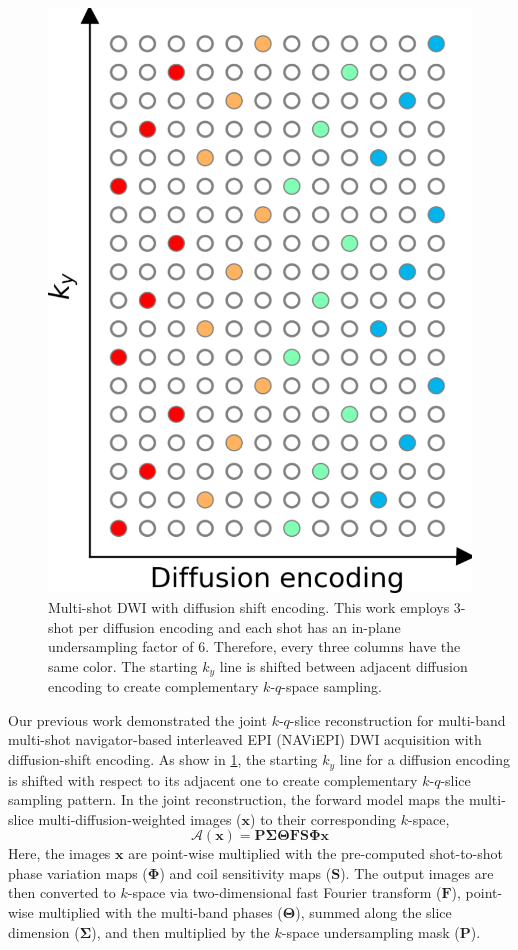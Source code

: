 \documentclass[AMA,STIX2COL,Linenumberson]{MRM}
\begin{document}
\begin{figure}
	\centering
	\includegraphics[width=0.7\columnwidth]{./figures/fig1.png}
	\caption{Multi-shot DWI with diffusion shift encoding. 
		This work employs 3-shot per diffusion encoding and each shot has an in-plane undersampling factor of 6.
		Therefore, every three columns have the same color. The starting $k_y$ line is shifted between 
		adjacent diffusion encoding to create complementary $k$-$q$-space sampling.}
	\label{FIG:SHIFT}
\end{figure}

Our previous work \cite{tan_2024_naviepi} demonstrated
the joint $k$-$q$-slice reconstruction 
for multi-band multi-shot navigator-based interleaved EPI (NAViEPI) DWI acquisition 
with diffusion-shift encoding.
As show in \cref{FIG:SHIFT}, the starting $k_y$ line for a diffusion encoding is shifted 
with respect to its adjacent one to create complementary $k$-$q$-slice sampling pattern.
In the joint reconstruction, the forward model 
maps the multi-slice multi-diffusion-weighted images ($\mathbf{x}$)
to their corresponding $k$-space,
\begin{equation}
	\mathcal{A}(\mathbf{x}) = \mathbf{P \Sigma \Theta F S \Phi} \mathbf{x}
	\label{EQU:FWD}
\end{equation}
Here, the images $\mathbf{x}$ are point-wise multiplied
with the pre-computed shot-to-shot phase variation maps ($\mathbf{\Phi}$)
and coil sensitivity maps ($\mathbf{S}$).
The output images are then converted to $k$-space
via two-dimensional fast Fourier transform ($\mathbf{F}$),
point-wise multiplied with the multi-band phases ($\mathbf{\Theta}$),
summed along the slice dimension ($\mathbf{\Sigma}$),
and then multiplied by the $k$-space undersampling mask ($\mathbf{P}$).
\end{document}
